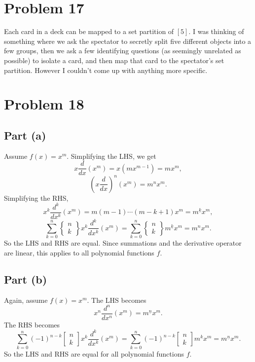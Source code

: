 \documentclass{article}
\newcommand{\fstirling}[2]
    {\left[
    \begin{matrix}
        #1 \\
        #2
    \end{matrix}
    \right]}
\newcommand{\sstirling}[2]
    {\left\{
    \begin{matrix}
        #1 \\
        #2
    \end{matrix}
    \right\}}
\begin{document}
\section*{Problem 17}
Each card in a deck can be mapped to a set partition of $[5]$. I was thinking of something where we ask the spectator to secretly split five different objects into a few groups, then we ask a few identifying questions (as seemingly unrelated as possible) to isolate a card, and then map that card to the spectator's set partition. However I couldn't come up with anything more specific.

\section*{Problem 18}
\subsection*{Part (a)}
Assume $f(x) = x^m$. Simplifying the LHS, we get
$$x\frac{d}{dx}(x^m) = x(mx^{m -1}) = mx^m,$$
$$\left(x\frac{d}{dx}\right)^n(x^m) = m^nx^m.$$
Simplifying the RHS,
$$x^k\frac{d^k}{dx^k}(x^m) = m(m - 1)\cdots (m-k + 1)x^m = m^{\underline{k}}x^m,$$
$$\sum_{k = 0}^n \sstirling nk x^k \frac{d^k}{dx^k}(x^m) = \sum_{k = 0}^n \sstirling nk m^{\underline{k}}x^m = m^nx^m.$$
So the LHS and RHS are equal. Since summations and the derivative operator are linear, this applies to all polynomial functions $f$.

\subsection*{Part (b)}
Again, assume $f(x) = x^m$. The LHS becomes
$$x^n\frac{d^n}{dx^n}(x^m) = m^{\underline{n}}x^m.$$
The RHS becomes
$$\sum_{k = 0}^n (-1)^{n - k} \fstirling nk x^k\frac{d^k}{dx^k}(x^m) = \sum_{k = 0}^n (-1)^{n - k} \fstirling nk m^kx^m = m^{\underline{n}}x^m.$$
So the LHS and RHS are equal for all polynomial functions $f$.
\end{document}
